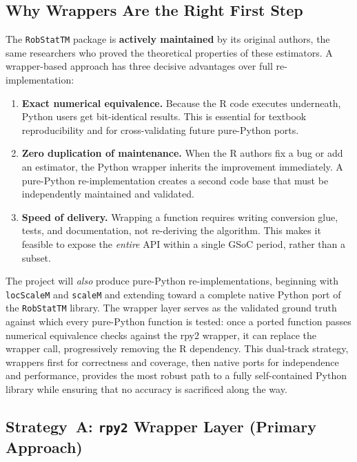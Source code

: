 \documentclass[11pt, a4paper]{article}
\begin{document}
\subsection{Why Wrappers Are the Right First Step}

The \texttt{RobStatTM} package is \textbf{actively maintained} by its
original authors, the same researchers who proved the theoretical
properties of these estimators.
A wrapper-based approach has three decisive advantages over full
re-implementation:

\begin{enumerate}[leftmargin=2em]
  \item \textbf{Exact numerical equivalence.}  Because the R code
    executes underneath, Python users get bit-identical results.
    This is essential for textbook reproducibility and for
    cross-validating future pure-Python ports.
  \item \textbf{Zero duplication of maintenance.}  When the R authors
    fix a bug or add an estimator, the Python wrapper inherits the
    improvement immediately.
    A pure-Python re-implementation creates a second code base that
    must be independently maintained and validated.
  \item \textbf{Speed of delivery.}  Wrapping a function requires
    writing conversion glue, tests, and documentation, not
    re-deriving the algorithm.
    This makes it feasible to expose the \emph{entire} API within a
    single GSoC period, rather than a subset.
\end{enumerate}

\noindent
The project will \emph{also} produce pure-Python re-implementations,
beginning with \texttt{locScaleM} and \texttt{scaleM} and extending
toward a complete native Python port of the \texttt{RobStatTM} library.
The wrapper layer serves as the validated ground truth against which
every pure-Python function is tested: once a ported function passes
numerical equivalence checks against the rpy2 wrapper, it can replace
the wrapper call, progressively removing the R dependency.
This dual-track strategy, wrappers first for correctness and coverage,
then native ports for independence and performance, provides the most
robust path to a fully self-contained Python library while ensuring that
no accuracy is sacrificed along the way.

\subsection{Strategy~A: \texttt{rpy2} Wrapper Layer (Primary Approach)}
\end{document}
